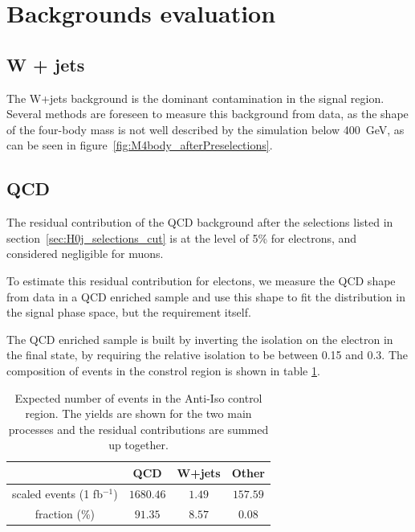 \section{Backgrounds evaluation}
\label{sec:backgrounds}


\subsection{W + jets}

The W+jets background is the dominant contamination in the signal region.
Several methods are foreseen to measure this background from data, 
as the shape of the four-body mass is not well described by the simulation below 400~GeV, 
as can be seen in figure~\ref{fig:M4body_afterPreselections}.


\subsection{QCD}

The residual contribution of the QCD background after the selections listed in section~\ref{sec:H0j_selections_cut}
is at the level of 5\% for electrons, and considered negligible for muons.

To estimate this residual contribution for electons, 
we measure the QCD \MET shape from data in a QCD enriched sample
and use this shape to fit the \MET distribution in the signal phase space, 
but the \MET requirement itself. 

The QCD enriched sample is built by inverting the isolation on the electron in the final state, 
by requiring the relative isolation to be between 0.15 and 0.3. The composition of events in the 
constrol region is shown in table \ref{tab:invIsoYields}.

\begin{table}[htb]
  \begin{center}
  \begin{tabular}{c|c|c|c}
  \hline
        & QCD  & W+jets & Other \\
  \hline
  scaled events (1 fb$^{-1}$)    & \scriptsize{$1680.46$} & \scriptsize{$1.49$} & \scriptsize{$157.59$} \\
  
  fraction (\%)                & \scriptsize{$91.35$} & \scriptsize{$8.57$} & \scriptsize{$0.08$} \\
  \hline
  \end{tabular}
  \end{center}
  \caption{Expected number of events in the Anti-Iso control region. The yields are shown for the two main processes
           and the residual contributions are summed up together.}
  \label{tab:invIsoYields}
\end{table}

